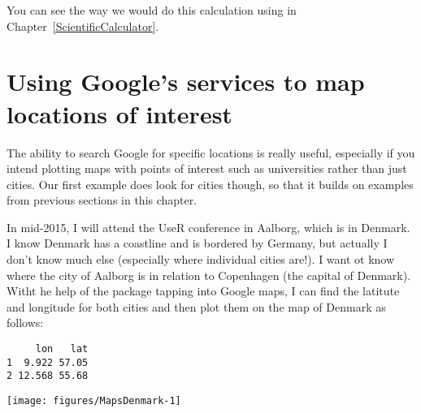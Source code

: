 You can see the way we would do this calculation using \R{} in Chapter~\ref{ScientificCalculator}. 
 
 
\section{Using Google's services to map locations of interest} 
 
The ability to search Google for specific locations is really useful, especially if you intend plotting maps with points of interest such as universities rather than just cities. Our first example does look for cities though, so that it builds on examples from previous sections in this chapter. 
 
In mid-2015, I will attend the UseR conference in Aalborg, which is in Denmark. I know Denmark has a coastline and is bordered by Germany, but actually I don't know much else (especially where individual cities are!). I want ot know where the city of Aalborg is in relation to Copenhagen (the capital of Denmark). Witht he help of the  package tapping into Google maps, I can find the latitute and longitude for both cities and then plot them on the map of Denmark as follows: 
\begin{knitrout}
\color{fgcolor}\begin{kframe}
\begin{alltt}
\hlstd{> } \hlkwb{=} \hlstd{(}\hlstd{=}\hlstd{(}\hlstd{,} \hlstd{))}
\end{alltt}


{\ttfamily\noindent\itshape\color{messagecolor}{Information from URL : http://maps.googleapis.com/maps/api/geocode/json?address=Aalborg\&sensor=false}}

{\ttfamily\noindent\itshape\color{messagecolor}{Information from URL : http://maps.googleapis.com/maps/api/geocode/json?address=Copenhagen\&sensor=false}}\begin{alltt}
\hlstd{> }
\end{alltt}
\begin{verbatim}
     lon   lat
1  9.922 57.05
2 12.568 55.68
\end{verbatim}
\begin{alltt}
\hlstd{> }\hlstd{(}\hlstd{,} \hlstd{)}
\hlstd{> }\hlstd{(}\hlstd{)}
\hlstd{> } \hlstd{=}\hlstd{)}
\end{alltt}
\end{kframe}
\texttt{[image: figures/MapsDenmark-1]} 

\end{knitrout}


